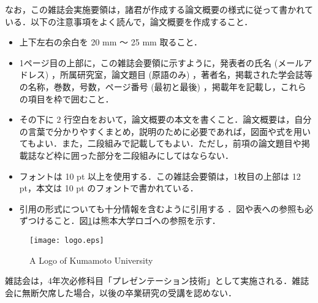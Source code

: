 \documentclass[10pt,a4j,uplatex,twoside]{jsarticle}
\begin{document}
    なお，この雑誌会実施要領は，諸君が作成する論文概要の様式に従って書かれている．以下の注意事項をよく読んで，論文概要を作成すること．
    \begin{itemize}
        \item 上下左右の余白を 20 mm ～ 25 mm 取ること．
        \item 1ページ目の上部に，この雑誌会要領に示すように，発表者の氏名 (メールアドレス) ，所属研究室，論文題目 (原語のみ) ，著者名，掲載された学会誌等の名称，巻数，号数，ページ番号 (最初と最後) ，掲載年を記載し，これらの項目を枠で囲むこと．
        \item その下に 2 行空白をおいて，論文概要の本文を書くこと．論文概要は，自分の言葉で分かりやすくまとめ，説明のために必要であれば，図面や式を用いてもよい．また，二段組みで記載してもよい．ただし，前項の論文題目や掲載誌など枠に囲った部分を二段組みにしてはならない．
        \item フォントは 10 pt 以上を使用する．この雑誌会要領は，1枚目の上部は 12 pt，本文は 10 pt のフォントで書かれている．%
        \item 引用の形式についても十分情報を含むように引用する \cite{howtocite}．図や表への参照も必ずつけること．図\ref{logo}は熊本大学ロゴへの参照を示す．
    \end{itemize}

\begin{figure}[htbp]
    \centering
    \texttt{[image: logo.eps]} 
    \caption{A Logo of Kumamoto University}
    \label{logo}
\end{figure}

    雑誌会は，4年次必修科目「プレゼンテーション技術」として実施される．雑誌会に無断欠席した場合，以後の卒業研究の受講を認めない．



\end{document}
